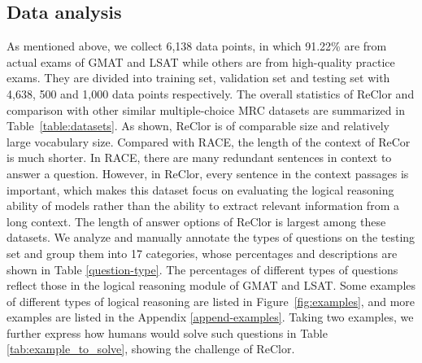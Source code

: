 \documentclass{article} \usepackage{iclr2020_conference,times}
\begin{document}
\subsection{Data analysis}
As mentioned above, we collect 6,138 data points, in which 91.22\% are from actual exams of GMAT and LSAT while others are from high-quality practice exams. They are divided into training set, validation set and testing set with 4,638, 500 and 1,000 data points respectively. The overall statistics of ReClor and comparison with other similar multiple-choice MRC datasets are summarized in Table~\ref{table:datasets}. As shown, ReClor is of comparable size and relatively large vocabulary size. Compared with RACE, the length of the context of ReCor is much shorter. In RACE, there are many redundant sentences in context to answer a question. However, in ReClor, every sentence in the context passages is important, which makes this dataset focus on evaluating the logical reasoning ability of models rather than the ability to extract relevant information from a long context. The length of answer options of ReClor is largest among these datasets. We analyze and manually annotate the types of questions on the testing set and group them into 17 categories, whose percentages and descriptions are shown in Table \ref{question-type}. The percentages of different types of questions reflect those in the logical reasoning module of GMAT and LSAT. Some examples of different types of logical reasoning are listed in Figure~\ref{fig:examples}, and more examples are listed in the Appendix \ref{append-examples}. Taking two examples, we further express how humans would solve such questions in Table \ref{tab:example_to_solve}, showing the challenge of ReClor. 
\end{document}
